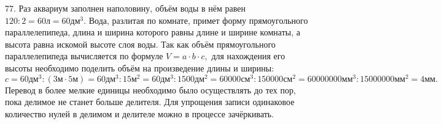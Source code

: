 77. Раз аквариум заполнен наполовину, объём воды в нём равен $120:2=60\text{л}=60\text{дм}^3.$ Вода, разлитая по комнате, примет форму прямоугольного параллелепипеда, длина и ширина которого равны длине и ширине комнаты, а высота равна искомой высоте слоя воды. Так как объём прямоугольного параллелепипеда вычисляется по формуле $V=a\cdot b\cdot c,$ для нахождения его высоты необходимо поделить объём на произведение длины и ширины: $c=60\text{дм}^3:(3\text{м}\cdot5\text{м})=60\text{дм}^3:15\text{м}^2=60\text{дм}^3:1500\text{дм}^2=60000\text{см}^3:150000\text{см}^2=60000000\text{мм}^3:15000000\text{мм}^2=
4\text{мм}.$ Перевод в более мелкие единицы необходимо было осуществлять до тех пор, пока делимое не станет больше делителя. Для упрощения записи одинаковое количество нулей в делимом и делителе можно в процессе зачёркивать.\\
